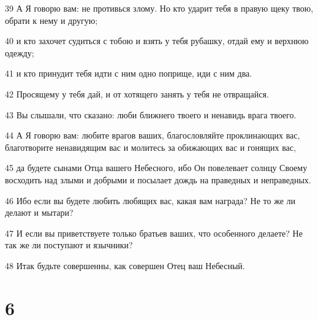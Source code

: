 \par 39 А Я говорю вам: не противься злому. Но кто ударит тебя в правую щеку твою, обрати к нему и другую;
\par 40 и кто захочет судиться с тобою и взять у тебя рубашку, отдай ему и верхнюю одежду;
\par 41 и кто принудит тебя идти с ним одно поприще, иди с ним два.
\par 42 Просящему у тебя дай, и от хотящего занять у тебя не отвращайся.
\par 43 Вы слышали, что сказано: люби ближнего твоего и ненавидь врага твоего.
\par 44 А Я говорю вам: любите врагов ваших, благословляйте проклинающих вас, благотворите ненавидящим вас и молитесь за обижающих вас и гонящих вас,
\par 45 да будете сынами Отца вашего Небесного, ибо Он повелевает солнцу Своему восходить над злыми и добрыми и посылает дождь на праведных и неправедных.
\par 46 Ибо если вы будете любить любящих вас, какая вам награда? Не то же ли делают и мытари?
\par 47 И если вы приветствуете только братьев ваших, что особенного делаете? Не так же ли поступают и язычники?
\par 48 Итак будьте совершенны, как совершен Отец ваш Небесный.

\chapter{6}

